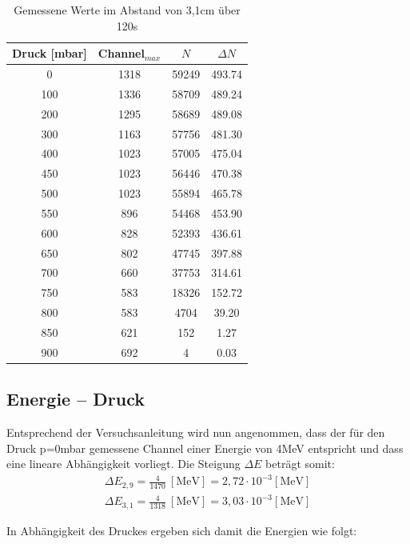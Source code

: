 \begin{table}[H]
\renewcommand{\arraystretch}{.95}
\begin{tabular}{|c|c|c|c|} 
Druck [mbar]	&Channel$_{max}$	&$N$	&$\Delta N$\\ \hline
0	&1318	&59249	&493.74 \\ \hline
100	&1336	&58709	&489.24\\ \hline
200	&1295	&58689	&489.08\\ \hline
300	&1163	&57756	&481.30\\ \hline
400	&1023	&57005	&475.04\\ \hline
450	&1023	&56446	&470.38\\ \hline
500	&1023	&55894	&465.78\\ \hline
550	&896	&54468	&453.90\\ \hline
600	&828	&52393	&436.61\\ \hline
650	&802	&47745	&397.88\\ \hline
700	&660	&37753	&314.61\\ \hline
750	&583	&18326	&152.72\\ \hline
800	&583	&4704	&39.20\\ \hline
850	&621	&152	&1.27\\ \hline
900	&692	&4		&0.03\\ \hline
\end{tabular} 
\renewcommand{\arraystretch}{1}
\caption{Gemessene Werte im Abstand von 3,1cm über 120s}
\end{table}

\subsection{Energie -- Druck}
Entsprechend der Versuchsanleitung wird nun angenommen, dass der für den Druck p=0mbar gemessene Channel einer Energie von 4MeV entspricht und dass eine lineare Abhängigkeit vorliegt. Die Steigung $\Delta E$ beträgt somit:
\begin{align*}
\Delta E_{2,9}=\frac{4}{1470}~[\text{MeV}] = 2,72\cdot10^{-3}[\text{MeV}]\\
\Delta E_{3,1}=\frac{4}{1318}~[\text{MeV}] = 3,03\cdot10^{-3}[\text{MeV}]
\end{align*}

In Abhängigkeit des Druckes ergeben sich damit die Energien wie folgt:\\

